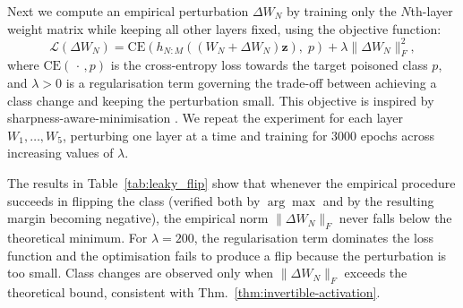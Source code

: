 \documentclass{article}
\theoremstyle{plain}
\theoremstyle{definition}
\theoremstyle{remark}
\begin{document}

Next we compute an empirical perturbation \(\Delta W_N\) by training only the $N$th-layer weight matrix while keeping all other layers fixed, using the objective function:
\[
\mathcal{L}(\Delta W_N)
=\mathrm{CE}\!\left( h_{N:M}((W_N+\Delta W_N)\mathbf{z}),\;p\right)
+\lambda\|\Delta W_N\|_F^2,
\]
where \(\mathrm{CE}(\, \cdot \, ,p)\) is the cross-entropy loss towards the target poisoned class \(p\), and \(\lambda>0\) is a regularisation term governing the trade-off between achieving a class change and keeping the perturbation small. This objective is inspired by sharpness-aware-minimisation \cite{foret_sharpness-aware_2021}. We repeat the experiment for each layer $W_1,\dots,W_5$, perturbing one layer at a time and training for 3000 epochs across increasing values of $\lambda$. 

The results in Table~\ref{tab:leaky_flip} show that whenever the empirical procedure succeeds in flipping the class (verified both by \(\arg\max\) and by the resulting margin becoming negative), the empirical norm \(\|\Delta W_N\|_F\) never falls below the theoretical minimum.  For \(\lambda=200\), the regularisation term dominates the loss function and the optimisation fails to produce a flip because the perturbation is too small.  Class changes are observed only when $\|\Delta W_N\|_F$ exceeds the theoretical bound, consistent with Thm.~\ref{thm:invertible-activation}.
\end{document}
